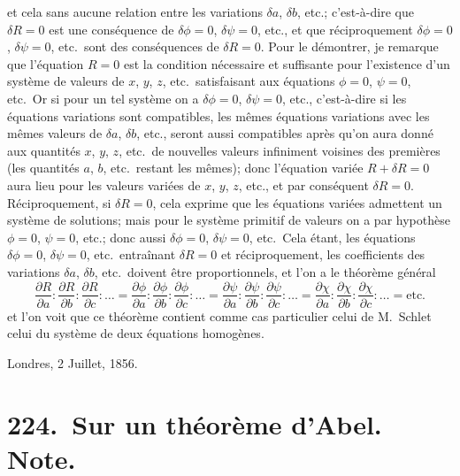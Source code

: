 \documentclass[11pt,a4paper]{book}
\begin{document}
et cela sans aucune relation entre les variations $\delta a$, $\delta b$, etc.; c'est-\`{a}-dire que $\delta R=0$ est une cons\'{e}quence de $\delta\phi=0$, $\delta\psi=0$, etc., et que r\'{e}ciproquement $\delta\phi=0$, $\delta\psi=0$, etc.\ sont des cons\'{e}quences de $\delta R=0$. Pour le d\'{e}montrer, je remarque que l'\'{e}quation $R=0$ est la condition n\'{e}cessaire et suffisante pour l'existence d'un syst\`{e}me de valeurs de $x$, $y$, $z$, etc.\ satisfaisant aux \'{e}quations $\phi=0$, $\psi=0$, etc.\ Or si pour un tel syst\`{e}me on a $\delta\phi=0$, $\delta\psi=0$, etc., c'est-\`{a}-dire si les \'{e}quations variations sont compatibles, les m\^{e}mes \'{e}quations variations avec les m\^{e}mes valeurs de $\delta a$, $\delta b$, etc., seront aussi compatibles apr\`{e}s qu'on aura donn\'{e} aux quantit\'{e}s $x$, $y$, $z$, etc.\ de nouvelles valeurs infiniment voisines des premi\`{e}res (les quantit\'{e}s $a$, $b$, etc.\ restant les m\^{e}mes); donc l'\'{e}quation vari\'{e}e $R+\delta R=0$ aura lieu pour les valeurs vari\'{e}es de $x$, $y$, $z$, etc., et par cons\'{e}quent $\delta R=0$. R\'{e}ciproquement, si $\delta R=0$, cela exprime que les \'{e}quations vari\'{e}es admettent un syst\`{e}me de solutions; mais pour le syst\`{e}me primitif de valeurs on a par hypoth\`{e}se $\phi=0$, $\psi=0$, etc.; donc aussi $\delta\phi=0$, $\delta\psi=0$, etc.\ Cela \'{e}tant, les \'{e}quations $\delta\phi=0$, $\delta\psi=0$, etc.\ entra\^{i}nant $\delta R=0$ et r\'{e}ciproquement, les coefficients des variations $\delta a$, $\delta b$, etc.\ doivent \^{e}tre proportionnels, et l'on a le th\'{e}or\`{e}me g\'{e}n\'{e}ral
\begin{equation}
\frac{\partial R}{\partial a}:\frac{\partial R}{\partial b}:\frac{\partial R}{\partial c}:\ldots
=\frac{\partial\phi}{\partial a}:\frac{\partial\phi}{\partial b}:\frac{\partial\phi}{\partial c}:\ldots
=\frac{\partial\psi}{\partial a}:\frac{\partial\psi}{\partial b}:\frac{\partial\psi}{\partial c}:\ldots
=\frac{\partial\chi}{\partial a}:\frac{\partial\chi}{\partial b}:\frac{\partial\chi}{\partial c}:\ldots
=\text{etc.}
\end{equation}
et l'on voit que ce th\'{e}or\`{e}me contient comme cas particulier celui de M.~Schl\afli et celui du syst\`{e}me de deux \'{e}quations homog\`{e}nes.

Londres, 2 Juillet, 1856.
\newpage

\chapter[Sur un th\'{e}or\`{e}me d'Abel]{224.\ Sur un th\'{e}or\`{e}me d'Abel. Note.}
\label{paper224}
\end{document}
